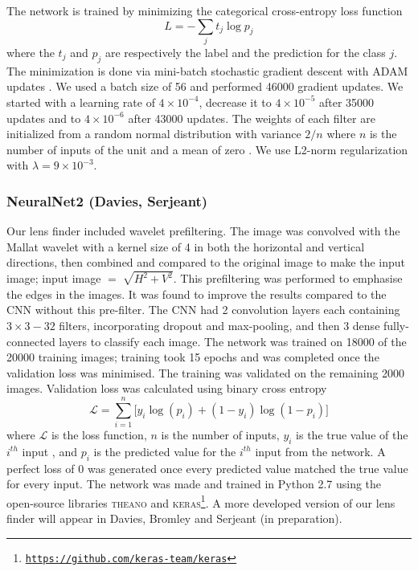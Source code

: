 \documentclass{aa}
\begin{document}
The network is trained by minimizing the categorical cross-entropy loss function
\begin{equation}
L = -\sum_j t_{j}\log p_{j}
\label{EQloss}
\end{equation}
where the $t_j$ and $p_j$ are respectively the label and the prediction for the class $j$. 
The minimization is done via mini-batch stochastic gradient descent with ADAM updates \citep{Kingma_2014}. We used a batch size of 56 and performed  46000 gradient updates. We started with a learning rate of $4 \times 10^{-4}$, decrease it to $4 \times 10^{-5}$ after 35000 updates and to $4 \times 10^{-6}$ after 43000 updates.
The weights of each filter are initialized from a random normal distribution with variance ${2/n}$ where $n$ is the number of inputs of the unit  and a mean of zero \citep{He2015a}.  
We use L2-norm regularization with $\lambda= 9 \times 10^{-3}$.

\subsubsection{NeuralNet2 (Davies, Serjeant) }
\label{sec:NeuralNet2}

Our lens finder included wavelet prefiltering. The image was convolved with the Mallat wavelet with a kernel size of 4 in both the horizontal and vertical directions, then combined and compared to the original image to make the input image;  input image $= \sqrt[]{H^{2}+V^{2}}$. This prefiltering was performed to emphasise the edges in the images. It was found to improve the results compared to the CNN without this pre-filter. The CNN had 2 convolution layers each containing  $3\times3 - 32$ filters, incorporating dropout and max-pooling, and then 3 dense fully-connected layers to classify each image. The network was trained on 18000 of the 20000 training images; training took 15 epochs and was completed once the validation loss was minimised. The training was validated on the remaining 2000 images. Validation loss was calculated using binary cross entropy
\begin{equation}
\mathcal{L} = \sum_{i=1}^{n} \big[ y_{i} \log(p_{i}) + (1  -  y_{i}) \log(1  -  p_{i}) \big]
\end{equation} 
where $\mathcal{L}$ is the loss function, $n$ is the number of inputs, $y_{i}$ is the true value of the $i^{th}$ input , and $p_{i}$ is the predicted value for the $i^{th}$ input from the network. A perfect loss of $0$ was generated once every predicted value matched the true value for every input. The network was made and trained in Python 2.7 using the open-source libraries \textsc{theano} and \textsc{keras}\footnote{\href{https://github.com/keras-team/keras}{\tt https://github.com/keras-team/keras}}. A more developed version of our lens finder will appear in Davies, Bromley and Serjeant (in preparation).
\end{document}
